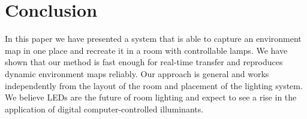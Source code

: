 
\chapter{Conclusion}

  In this paper we have presented a system that is able to capture an environment map in one place and recreate it in a room with controllable lamps.
  We have shown that our method is fast enough for real-time transfer and reproduces dynamic environment maps reliably.
  Our approach is general and works independently from the layout of the room and placement of the lighting system.
  We believe LEDs are the future of room lighting and expect to see a rise in the application of digital computer-controlled illuminants.
